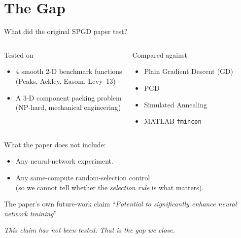 \documentclass[11pt,aspectratio=169]{beamer}
\begin{document}

\section{The Gap}

\begin{frame}{What did the original SPGD paper test?}
  \begin{columns}[T,onlytextwidth]
      \begin{block}{Tested on}
        \begin{itemize}
          \item 4 smooth 2-D benchmark functions \\
                (Peaks, Ackley, Easom, Levy~13)
          \item A 3-D component packing problem \\
                (NP-hard, mechanical engineering)
        \end{itemize}
      \end{block}
      \begin{block}{Compared against}
        \begin{itemize}
          \item Plain Gradient Descent (GD)
          \item PGD
          \item Simulated Annealing
          \item MATLAB \texttt{fmincon}
        \end{itemize}
      \end{block}
  \end{columns}

  \vspace{0.6em}
  \alert{What the paper does not include:}
  \begin{itemize}\setlength\itemsep{0.25em}
    \item Any neural-network experiment.
    \item Any same-compute random-selection control \\
          (so we cannot tell whether the \emph{selection rule} is what matters).
  \end{itemize}

  \pause
  \vspace{0.5em}
  \begin{block}{The paper's own future-work claim}
    ``\emph{Potential to significantly enhance neural network training}''
  \end{block}
  \centering
  \emph{This claim has not been tested. That is the gap we close.}
\end{frame}
\end{document}
